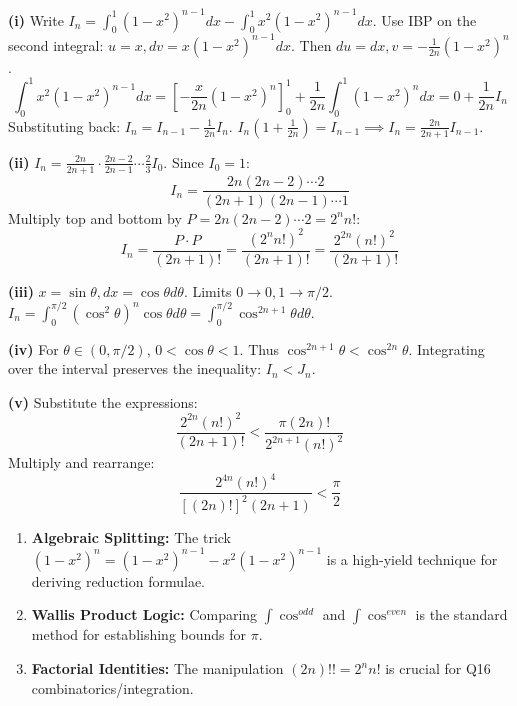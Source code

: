 \begin{solution}
\textbf{(i)}
Write $I_n = \int_0^1 (1-x^2)^{n-1} dx - \int_0^1 x^2 (1-x^2)^{n-1} dx$.
Use IBP on the second integral: $u=x, dv=x(1-x^2)^{n-1}dx$.
Then $du=dx, v = -\frac{1}{2n}(1-x^2)^n$.
\[ \int_0^1 x^2(1-x^2)^{n-1} dx = \left[ -\frac{x}{2n}(1-x^2)^n \right]_0^1 + \frac{1}{2n} \int_0^1 (1-x^2)^n dx = 0 + \frac{1}{2n} I_n \]
Substituting back: $I_n = I_{n-1} - \frac{1}{2n} I_n$.
$I_n(1 + \frac{1}{2n}) = I_{n-1} \implies I_n = \frac{2n}{2n+1} I_{n-1}$.

\textbf{(ii)}
$I_n = \frac{2n}{2n+1} \cdot \frac{2n-2}{2n-1} \cdots \frac{2}{3} I_0$. Since $I_0 = 1$:
\[ I_n = \frac{2n(2n-2)\cdots 2}{(2n+1)(2n-1)\cdots 1} \]
Multiply top and bottom by $P = 2n(2n-2)\cdots 2 = 2^n n!$:
\[ I_n = \frac{P \cdot P}{(2n+1)!} = \frac{(2^n n!)^2}{(2n+1)!} = \frac{2^{2n} (n!)^2}{(2n+1)!} \]

\textbf{(iii)}
$x=\sin\theta, dx=\cos\theta d\theta$. Limits $0 \to 0, 1 \to \pi/2$.
$I_n = \int_0^{\pi/2} (\cos^2\theta)^n \cos\theta d\theta = \int_0^{\pi/2} \cos^{2n+1}\theta d\theta$.

\textbf{(iv)}
For $\theta \in (0, \pi/2)$, $0 < \cos \theta < 1$.
Thus $\cos^{2n+1}\theta < \cos^{2n}\theta$.
Integrating over the interval preserves the inequality: $I_n < J_n$.

\textbf{(v)}
Substitute the expressions:
\[ \frac{2^{2n} (n!)^2}{(2n+1)!} < \frac{\pi (2n)!}{2^{2n+1} (n!)^2} \]
Multiply and rearrange:
\[ \frac{2^{4n} (n!)^4}{[(2n)!]^2 (2n+1)} < \frac{\pi}{2} \]
\end{solution}

\begin{takeaways}
\begin{enumerate}
    \item \textbf{Algebraic Splitting:} The trick $(1-x^2)^n = (1-x^2)^{n-1} - x^2(1-x^2)^{n-1}$ is a high-yield technique for deriving reduction formulae.
    \item \textbf{Wallis Product Logic:} Comparing $\int \cos^{odd}$ and $\int \cos^{even}$ is the standard method for establishing bounds for $\pi$.
    \item \textbf{Factorial Identities:} The manipulation $(2n)!! = 2^n n!$ is crucial for Q16 combinatorics/integration.
\end{enumerate}
\end{takeaways}

